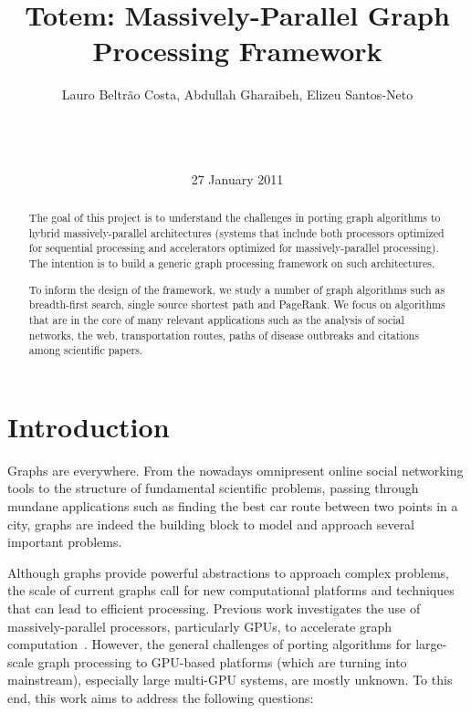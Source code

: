 \documentclass{acm_proc_article-sp}[12pt]
\title{Totem: Massively-Parallel Graph Processing Framework}
\author{
\alignauthor 
Lauro Beltr\~ao Costa, Abdullah Gharaibeh, Elizeu
Santos-Neto\vspace{3mm}\\
       \affaddr{\small{University of British Columbia}}\\
       \affaddr{\small{2332 Main Mall}}\\
       \affaddr{\small{Vancouver, BC, CANADA}}\\
       \email{\small{\{lauroc,abdullah,elizeus\}@ece.ubc.ca}}
}
\date{27 January 2011}
\begin{document}
\maketitle
\begin{abstract}
The goal of this project is to understand the challenges in porting graph algorithms to hybrid massively-parallel architectures (systems that include both processors optimized for sequential processing and accelerators optimized for massively-parallel processing). The intention is to build a generic graph processing framework on such architectures.

To inform the design of the framework, we study a number of graph algorithms such as breadth-first search, single source shortest path and PageRank. We focus on algorithms that are in the core of many relevant applications such as the analysis of social networks, the web, transportation routes, paths of disease outbreaks and citations among scientific papers.

\end{abstract}


\section{Introduction}

Graphs are everywhere. From the nowadays omnipresent online social networking tools to the structure of fundamental scientific problems, passing through mundane applications such as finding the best car route between two points in a city, graphs are indeed the building block to model and approach several important problems.

Although graphs provide powerful abstractions to approach complex problems, the scale of current graphs call for new computational platforms and techniques that can lead to efficient processing. Previous work investigates the use of massively-parallel processors, particularly GPUs, to accelerate graph computation~\cite{Harish2007, Katz2008, Sungpack2010, dehne2010exploring}. However, the general challenges of porting algorithms for large-scale graph processing to GPU-based platforms (which are turning into mainstream), especially large multi-GPU systems, are mostly unknown. To this end, this work aims to address the following questions:
\end{document}
